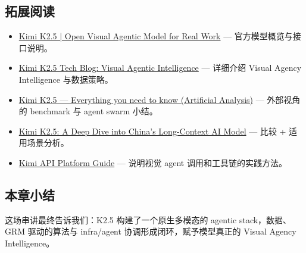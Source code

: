 \subsection{拓展阅读}
\begin{itemize}
    \item \href{https://www.kimi.com/ai-models/kimi-k2-5/}{Kimi K2.5 | Open Visual Agentic Model for Real Work} — 官方模型概览与接口说明。
    \item \href{https://www.kimi.com/blog/kimi-k2-5}{Kimi K2.5 Tech Blog: Visual Agentic Intelligence} — 详细介绍 Visual Agency Intelligence 与数据策略。
    \item \href{https://artificialanalysis.ai/articles/kimi-k2-5-everything-you-need-to-know}{Kimi K2.5 — Everything you need to know (Artificial Analysis)} — 外部视角的 benchmark 与 agent swarm 小结。
    \item \href{https://futuretechdiaries.com/article.php?slug=kimi-k2-5-a-deep-dive-into-chinas-long-context-ai-model}{Kimi K2.5: A Deep Dive into China’s Long-Context AI Model} — 比较 + 适用场景分析。
    \item \href{https://platform.kimi.ai/docs/guide}{Kimi API Platform Guide} — 说明视觉 agent 调用和工具链的实践方法。
\end{itemize}

\subsection{本章小结}
这场串讲最终告诉我们：K2.5 构建了一个原生多模态的 agentic stack，数据、GRM 驱动的算法与 infra/agent 协调形成闭环，赋予模型真正的 Visual Agency Intelligence。


